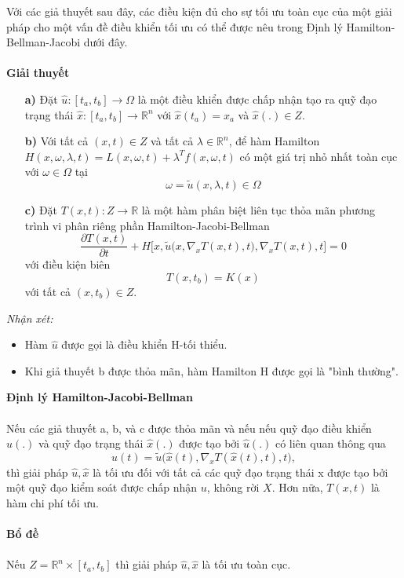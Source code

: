 \documentclass[12pt,a4paper]{report}
\begin{document}
	Với các giả thuyết sau đây, các điều kiện đủ cho sự tối ưu toàn cục của một giải pháp cho một vấn đề điều khiển tối ưu có thể được nêu trong Định lý Hamilton-Bellman-Jacobi dưới đây.\\\\
	\textbf{Giải thuyết}
	\begin{enumerate}
		\item[\textbf{a)}] Đặt $\hat{u}: [t_a, t_b] \to \Omega$ là một điều khiển được chấp nhận tạo ra quỹ đạo trạng thái $\hat{x}: [t_a, t_b] \to \mathbb{R}^n$ với $\hat{x}(t_a) = x_a$ và $\hat{x}(.) \in Z.$
		\item [\textbf{b)}] Với tất cả $(x, t) \in Z$ và tất cả $\lambda \in \mathbb{R}^n$, để hàm Hamilton $H(x, \omega, \lambda, t) = L(x, \omega, t) + \lambda^Tf(x, \omega, t)$ có một giá trị nhỏ nhất toàn cục với $\omega \in \Omega$ tại $$\omega = \tilde{u}(x, \lambda, t) \in \Omega $$
		\item[\textbf{c)}] Đặt $T(x, t): Z \to \mathbb{R}$ là một hàm phân biệt liên tục thỏa mãn phương trình vi phân riêng phần Hamilton-Jacobi-Bellman $$\frac{\partial T(x, t)}{\partial t} + H\bigg[x, \tilde{u}\big(x, \nabla_xT(x, t), t\big), \nabla_xT(x, t), t\bigg] = 0$$ với điều kiện biên $$T(x, t_b) = K(x)$$ với tất cả $(x, t_b) \in Z$.
	\end{enumerate}
		\textit{Nhận xét:}
		\begin{itemize}
			\item Hàm $\hat{u}$ được gọi là điều khiển H-tối thiểu.
			\item Khi giả thuyết b được thỏa mãn, hàm Hamilton H được gọi là "bình thường". 
		\end{itemize}
		\textbf{Định lý Hamilton-Jacobi-Bellman} \\\\ Nếu các giả thuyết a, b, và c được thỏa mãn và nếu nếu quỹ đạo điều khiển $\hat{u}(.)$ và quỹ đạo trạng thái $\hat{x}(.)$ được tạo bởi $\hat{u}(.)$ có liên quan thông qua $$\hat{u}(t) = \tilde{u}\big(\hat{x}(t), \nabla_xT(\hat{x}(t), t), t\big), $$ 
		thì giải pháp $\hat{u}, \hat{x}$ là tối ưu đối với tất cả các quỹ đạo trạng thái x được tạo bởi một quỹ đạo kiểm soát được chấp nhận $u$, không rời $X$. Hơn nữa, $T(x, t)$ là hàm chi phí tối ưu.
		\\\\
		\textbf{Bổ đề} \\\\ Nếu $Z = \mathbb{R}^n \times [t_a, t_b]$ thì giải pháp $\hat{u}, \hat{x}$ là tối ưu toàn cục.
\end{document}
